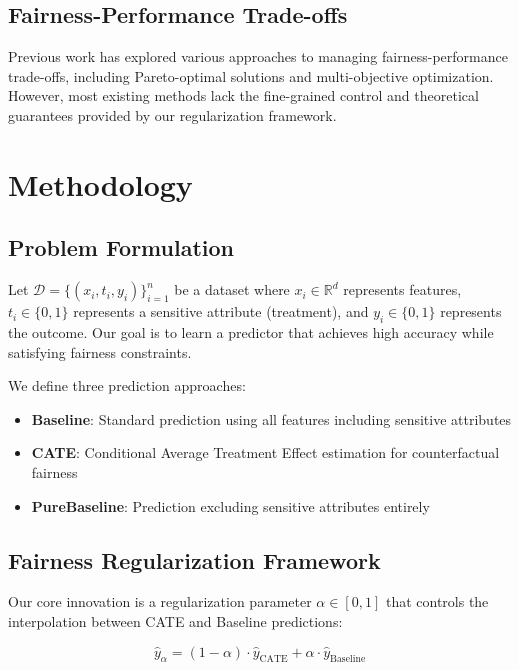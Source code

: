 \documentclass{article} %
\begin{document}
\subsection{Fairness-Performance Trade-offs}

Previous work has explored various approaches to managing fairness-performance trade-offs, including Pareto-optimal solutions and multi-objective optimization. However, most existing methods lack the fine-grained control and theoretical guarantees provided by our regularization framework.

\section{Methodology}

\subsection{Problem Formulation}

Let $\mathcal{D} = \{(x_i, t_i, y_i)\}_{i=1}^n$ be a dataset where $x_i \in \mathbb{R}^d$ represents features, $t_i \in \{0,1\}$ represents a sensitive attribute (treatment), and $y_i \in \{0,1\}$ represents the outcome. Our goal is to learn a predictor that achieves high accuracy while satisfying fairness constraints.

We define three prediction approaches:
\begin{itemize}
\item \textbf{Baseline}: Standard prediction using all features including sensitive attributes
\item \textbf{CATE}: Conditional Average Treatment Effect estimation for counterfactual fairness
\item \textbf{PureBaseline}: Prediction excluding sensitive attributes entirely
\end{itemize}

\subsection{Fairness Regularization Framework}

Our core innovation is a regularization parameter $\alpha \in [0,1]$ that controls the interpolation between CATE and Baseline predictions:

\begin{equation}
\hat{y}_{\alpha} = (1-\alpha) \cdot \hat{y}_{\text{CATE}} + \alpha \cdot \hat{y}_{\text{Baseline}}
\end{equation}
\end{document}
